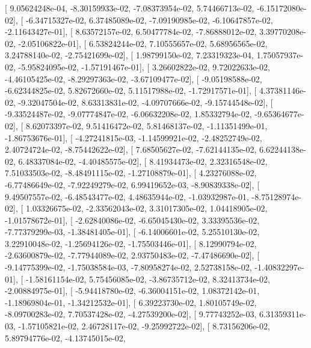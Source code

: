 \documentclass{article}
\begin{document}
       [  9.05624248e-04,  -8.30159933e-02,  -7.08373954e-02,
          5.74466713e-02,  -6.15172080e-02],
       [ -6.34715327e-02,   6.37485089e-02,  -7.09190985e-02,
         -6.10647857e-02,  -2.11643427e-01],
       [  8.63572157e-02,   6.50477784e-02,  -7.86888012e-02,
          3.39770208e-02,  -2.05106822e-01],
       [  6.53824244e-02,   7.10555657e-02,   5.68956565e-02,
          3.24788140e-02,  -2.75421699e-02],
       [  1.98799150e-02,   7.23319323e-04,   1.75057937e-02,
         -5.95824095e-02,  -1.57191467e-01],
       [  3.26602822e-02,   9.72022633e-02,  -4.46105425e-02,
         -8.29297363e-02,  -3.67109477e-02],
       [ -9.05198588e-02,  -6.62344825e-02,   5.82672660e-02,
          5.11517988e-02,  -1.72917571e-01],
       [  4.37381146e-02,  -9.32047504e-02,   8.63313831e-02,
         -4.09707666e-02,  -9.15744548e-02],
       [ -9.33524487e-02,  -9.07774847e-02,  -6.06632208e-02,
          1.85332794e-02,  -9.65364677e-02],
       [  8.62073397e-02,   9.51416472e-02,   5.81468137e-02,
         -1.11351499e-01,  -1.86753676e-01],
       [ -4.27241815e-03,  -1.14599921e-02,  -2.48252749e-02,
          2.40724724e-02,  -8.75442622e-02],
       [  7.68505627e-02,  -7.62144135e-02,   6.62244138e-02,
          6.48337084e-02,  -4.40485575e-02],
       [  8.41934473e-02,   2.32316548e-02,   7.51033503e-02,
         -8.48491115e-02,  -1.27108879e-01],
       [  4.23276088e-02,  -6.77486649e-02,  -7.92249279e-02,
          6.99419652e-03,  -8.90839338e-02],
       [  9.49507557e-02,  -6.48543477e-02,   4.48635944e-02,
         -1.03932987e-01,  -8.75128974e-02],
       [  1.03326675e-02,  -2.33562043e-02,   3.31017305e-02,
          1.04418905e-02,  -1.01578672e-01],
       [ -2.62840086e-02,  -6.65045430e-02,   3.33395536e-02,
         -7.77379299e-03,  -1.38481405e-01],
       [ -6.14006601e-02,   5.25510130e-02,   3.22910048e-02,
         -1.25694126e-02,  -1.75503446e-01],
       [  8.12990794e-02,  -2.63600879e-02,  -7.77944089e-02,
          2.93750483e-02,  -7.47486690e-02],
       [ -9.14775399e-02,  -1.75038584e-03,  -7.80958274e-02,
          2.52738158e-02,  -1.40832297e-01],
       [ -1.58161154e-02,   5.75456085e-02,  -3.86735712e-02,
          8.32413734e-02,  -2.00884975e-01],
       [ -5.94418780e-02,  -6.36004151e-02,   1.08372142e-01,
         -1.18969804e-01,  -1.34212532e-01],
       [  6.39223730e-02,   1.80105749e-02,  -8.09700283e-02,
          7.70537428e-02,  -4.27539200e-02],
       [  9.77743252e-03,   6.31359311e-03,  -1.57105821e-02,
          2.46728117e-02,  -9.25992722e-02],
       [  8.73156206e-02,   5.89794776e-02,  -4.13745015e-02,
\end{document}
